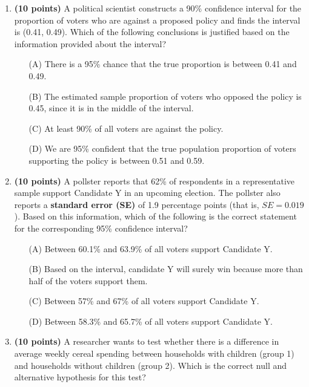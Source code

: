 \documentclass{article}
\newcommand{\blankbox}[2][3cm]{%
    \vspace{-0.5em}
    \begin{figure}[H]
        \makebox[\linewidth]{%
            \begin{tcolorbox}[
                colback=white, 
                colframe=white,  %
                width=#2, %
                height=#1,
                boxrule=0.2mm
            ]
            \end{tcolorbox}
        }
    \end{figure}
    \vspace{-2em}
}
\begin{document}
\begin{enumerate}
    \item \textbf{(10 points)}   A political scientist constructs a 90\% confidence interval for the proportion of voters who are against a proposed policy and finds the interval is (0.41, 0.49). Which of the following conclusions is justified based on the information provided about the interval?
    \begin{enumerate}
        \item[(A)] There is a 95\% chance that the true proportion is between 0.41 and 0.49.
        \item[(B)] The estimated sample proportion of voters who opposed the policy is 0.45, since it is in the middle of the interval.
        \item[(C)] At least 90\% of all voters are against the policy.
        \item[(D)]  We are 95\% confident that the true population proportion of voters supporting the policy is between 0.51 and 0.59.
    \end{enumerate} \blankbox[2cm]{1.0\linewidth}
    
    
    \item \textbf{(10 points)} A pollster reports that 62\% of respondents in a representative sample support Candidate Y in an upcoming election. The pollster also reports a \textbf{standard error (SE)} of 1.9 percentage points (that is, $SE=0.019$). Based on this information, which of the following is the correct statement for the corresponding 95\% confidence interval?
    
    \begin{enumerate}
        \item[(A)] Between 60.1\% and 63.9\% of all voters support Candidate Y.
        \item[(B)] Based on the interval, candidate Y will surely win because more than half of the voters support them.
        \item[(C)] Between 57\% and 67\% of all voters support Candidate Y.
        \item[(D)] Between 58.3\% and 65.7\% of all voters support Candidate Y.
    \end{enumerate}
    \blankbox[2cm]{1.0\linewidth}
    
    \item \textbf{(10 points)} A researcher wants to test whether there is a difference in average weekly cereal spending between households with children (group 1) and households without children (group 2). Which is the correct null and alternative hypothesis for this test?
    

\end{enumerate}
\end{document}
